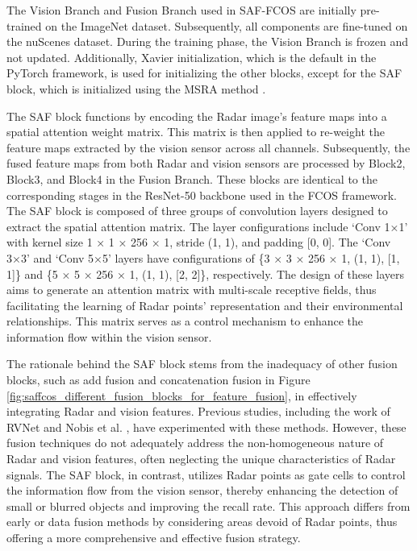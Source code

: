 \documentclass[report.tex]{subfiles}
\begin{document}
    The Vision Branch and Fusion Branch used in SAF-FCOS are initially pre-trained on the ImageNet \cite{russakovsky2015imagenet} dataset. Subsequently, all components are fine-tuned on the nuScenes \cite{caesar2020nuscenes} dataset. During the training phase, the Vision Branch is frozen and not updated. Additionally, Xavier initialization, which is the default in the PyTorch framework, is used for initializing the other blocks, except for the SAF block, which is initialized using the MSRA method \cite{he2015delving}.

    The SAF block functions by encoding the Radar image's feature maps into a spatial attention weight matrix. This matrix is then applied to re-weight the feature maps extracted by the vision sensor across all channels. Subsequently, the fused feature maps from both Radar and vision sensors are processed by Block2, Block3, and Block4 in the Fusion Branch. These blocks are identical to the corresponding stages in the ResNet-50 backbone used in the FCOS \cite{tian2019fcos} framework. The SAF block is composed of three groups of convolution layers designed to extract the spatial attention matrix. The layer configurations include `Conv 1×1' with kernel size 1 × 1 × 256 × 1, stride (1, 1), and padding [0, 0]. The `Conv 3×3' and `Conv 5×5' layers have configurations of \{3 × 3 × 256 × 1, (1, 1), [1, 1]\} and \{5 × 5 × 256 × 1, (1, 1), [2, 2]\}, respectively. The design of these layers aims to generate an attention matrix with multi-scale receptive fields, thus facilitating the learning of Radar points' representation and their environmental relationships. This matrix serves as a control mechanism to enhance the information flow within the vision sensor.

    The rationale behind the SAF block stems from the inadequacy of other fusion blocks, such as add fusion and concatenation fusion in Figure \ref{fig:saffcos_different_fusion_blocks_for_feature_fusion}, in effectively integrating Radar and vision features. Previous studies, including the work of RVNet \cite{john2019rvnet} and Nobis et al. \cite{nobis2019deep}, have experimented with these methods. However, these fusion techniques do not adequately address the non-homogeneous nature of Radar and vision features, often neglecting the unique characteristics of Radar signals. The SAF block, in contrast, utilizes Radar points as gate cells to control the information flow from the vision sensor, thereby enhancing the detection of small or blurred objects and improving the recall rate. This approach differs from early or data fusion methods by considering areas devoid of Radar points, thus offering a more comprehensive and effective fusion strategy.
\end{document}
